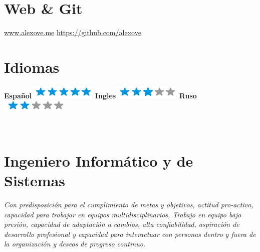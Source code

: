 \documentclass[]{friggeri-cv}
\begin{document}
\begin{aside}
    \section{Web \& Git}
    \href{http://alexove.me}{www.alexove.me}
    \href{https://github.com/alexove}{https://github.com/alexove}
    ~
    \section{Idiomas}
    \textbf{Espa\~nol}\includegraphics[scale=0.40]{img/5stars.png}
    \textbf{Ingles}\includegraphics[scale=0.40]{img/3stars.png}
    \textbf{Ruso}\includegraphics[scale=0.40]{img/2stars.png}
    ~
\end{aside}
~
\section{Ingeniero Inform\'atico y de Sistemas}
\emph{Con predisposici\'on para el cumplimiento de metas y objetivos, actitud pro-activa,
capacidad para trabajar en equipos multidisciplinarios, Trabajo en equipo bajo presi\'on,
capacidad de adaptaci\'on a cambios, alta confiabilidad, aspiraci\'on de desarrollo
profesional y capacidad para interactuar con personas dentro y fuera de la organizaci\'on y
deseos de progreso continuo.}
\\
\end{document}
